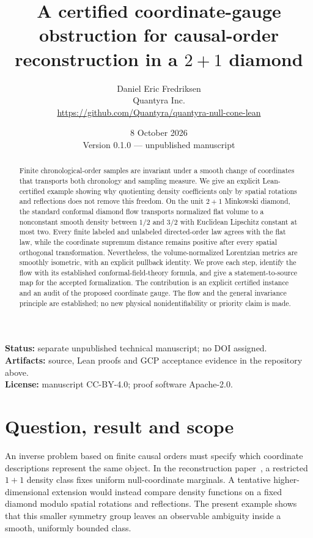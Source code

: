 \documentclass[11pt]{article}
\title{A certified coordinate-gauge obstruction for causal-order reconstruction in a $2+1$ diamond}
\author{Daniel Eric Fredriksen\\Quantyra Inc.\\\url{https://github.com/Quantyra/quantyra-null-cone-lean}}
\date{8 October 2026\\Version 0.1.0 --- unpublished manuscript}
\theoremstyle{remark}
\begin{document}
\maketitle
\begin{abstract}
Finite chronological-order samples are invariant under a smooth change of
coordinates that transports both chronology and sampling measure. We give an
explicit Lean-certified example showing why quotienting density coefficients
only by spatial rotations and reflections does not remove this freedom.
On the unit $2+1$ Minkowski diamond, the standard conformal diamond flow
transports normalized flat volume to a nonconstant smooth density between
$1/2$ and $3/2$ with Euclidean Lipschitz constant at most two.
Every finite labeled and unlabeled directed-order law agrees with the flat
law, while the coordinate supremum distance remains positive after every
spatial orthogonal transformation. Nevertheless, the volume-normalized
Lorentzian metrics are smoothly isometric, with an explicit pullback identity.
We prove each step, identify the flow with its established conformal-field-theory
formula, and give a statement-to-source map for the accepted formalization.
The contribution is an explicit certified instance and an audit of the
proposed coordinate gauge. The flow and the general invariance principle
are established; no new physical nonidentifiability or priority claim is made.
\end{abstract}

\noindent\textbf{Status:} separate unpublished technical manuscript; no DOI assigned.\\
\textbf{Artifacts:} source, Lean proofs and GCP acceptance evidence in the repository above.\\
\textbf{License:} manuscript CC-BY-4.0; proof software Apache-2.0.

\section{Question, result and scope}
An inverse problem based on finite causal orders must specify which
coordinate descriptions represent the same object. In the reconstruction
paper~\cite{Fredriksen}, a restricted $1+1$ density class fixes uniform
null-coordinate marginals. A tentative higher-dimensional extension would
instead compare density functions on a fixed diamond modulo spatial
rotations and reflections. The present example shows that this smaller
symmetry group leaves an observable ambiguity inside a smooth, uniformly
bounded class.
\end{document}
